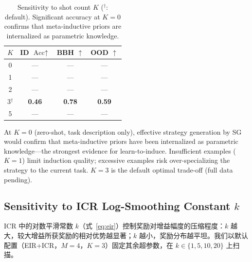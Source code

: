 \documentclass[11pt]{article}
\newcommand{\sg}{\textnormal{\textsc{SG}}}
\newcommand{\cdash}{---}                %
\begin{document}
\begin{table}[H]
  \centering
  \small
  \setlength{\tabcolsep}{6pt}
  \renewcommand{\arraystretch}{1.15}
  \begin{tabular}{cccc}
    \toprule
    $K$ & \textbf{ID} $\text{Acc}{\uparrow}$ & \textbf{BBH} ${\uparrow}$ & \textbf{OOD} ${\uparrow}$ \\
    \midrule
    0           & \cdash          & \cdash          & \cdash   \\
    1           & \cdash          & \cdash          & \cdash   \\
    2           & \cdash          & \cdash          & \cdash   \\
    3$^\dagger$ & \textbf{0.46}   & \textbf{0.78}   & \textbf{0.59}   \\
    5           & \cdash          & \cdash          & \cdash   \\
    \bottomrule
  \end{tabular}
  \caption{Sensitivity to shot count $K$ ($^\dagger$: default). Significant accuracy at $K{=}0$ confirms that meta-inductive priors are internalized as parametric knowledge.}
  \label{tab:k_sensitivity}
\end{table}

At $K{=}0$ (zero-shot, task description only), effective strategy generation by \sg{} would confirm that meta-inductive priors have been internalized as parametric knowledge---the strongest evidence for learn-to-induce. Insufficient examples ($K{=}1$) limit induction quality; excessive examples risk over-specializing the strategy to the current task. $K{=}3$ is the default optimal trade-off (full data pending).

\subsection{Sensitivity to ICR Log-Smoothing Constant \texorpdfstring{$k$}{k}}
\label{app:icr_k}

ICR 中的对数平滑常数 $k$（式~\eqref{eq:eir}）控制奖励对增益幅度的压缩程度：$k$ 越大，较大增益所获奖励的相对优势越显著；$k$ 越小，奖励分布越平坦。我们以默认配置（EIR+ICR，$M{=}4$，$K{=}3$）固定其余超参数，在 $k \in \{1, 5, 10, 20\}$ 上扫描。
\end{document}
